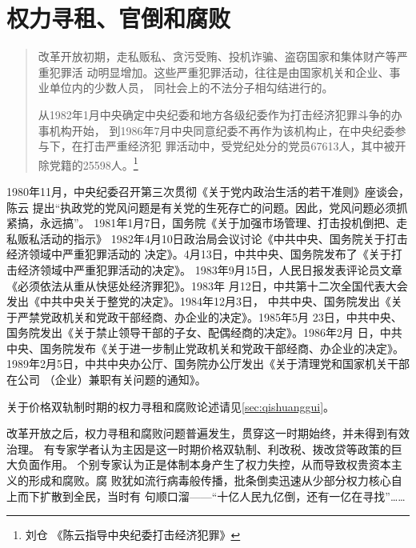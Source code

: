 \section{权力寻租、官倒和腐败}


\begin{quotation}
  改革开放初期，走私贩私、贪污受贿、投机诈骗、盗窃国家和集体财产等严重犯罪活
  动明显增加。这些严重犯罪活动，往往是由国家机关和企业、事业单位内的少数人员，
  同社会上的不法分子相勾结进行的。

  从1982年1月中央确定中央纪委和地方各级纪委作为打击经济犯罪斗争的办事机构开始，
  到1986年7月中央同意纪委不再作为该机构止，在中央纪委参与下，在打击严重经济犯
  罪活动中，受党纪处分的党员67613人，其中被开除党籍的25598人。\footnote{刘仓 《陈云指导中央纪委打击经济犯罪》}
\end{quotation}

1980年11月，中央纪委召开第三次贯彻《关于党内政治生活的若干准则》座谈会，陈云
提出“执政党的党风问题是有关党的生死存亡的问题。因此，党风问题必须抓紧搞，永远搞”。
1981年1月7日，国务院《关于加强市场管理、打击投机倒把、走私贩私活动的指示》
1982年4月10日政治局会议讨论《中共中央、国务院关于打击经济领域中严重犯罪活动的
决定》。4月13日，中共中央、国务院发布了《关于打击经济领域中严重犯罪活动的决定》。
1983年9月15日，人民日报发表评论员文章《必须依法从重从快惩处经济罪犯》。1983年
月12日，中共第十二次全国代表大会发出《中共中央关于整党的决定》。1984年12月3日，
中共中央、国务院发出《关于严禁党政机关和党政干部经商、办企业的决定》。1985年5月
23日，中共中央、国务院发出《关于禁止领导干部的子女、配偶经商的决定》。1986年2月
日，中共中央、国务院发布《关于进一步制止党政机关和党政干部经商、办企业的决定》。
1989年2月5日，中共中央办公厅、国务院办公厅发出《关于清理党和国家机关干部在公司
（企业）兼职有关问题的通知》。

关于价格双轨制时期的权力寻租和腐败论述请见\cref{sec:qishuanggui}。


改革开放之后，权力寻租和腐败问题普遍发生，贯穿这一时期始终，并未得到有效治理。
有专家学者认为主因是这一时期价格双轨制、利改税、拨改贷等政策的巨大负面作用。
个别专家认为正是体制本身产生了权力失控，从而导致权贵资本主义的形成和腐败。腐
败犹如流行病毒般传播，批条倒卖迅速从少部分权力核心自上而下扩散到全民，当时有
句顺口溜——“十亿人民九亿倒，还有一亿在寻找”……


